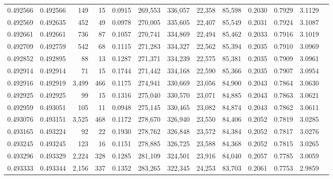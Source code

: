 \begin{tabular}{rrrrrrrrrrrrr}
0.492566 & 0.492566 &   149 &    15 &                                     0.0915 & 269,553 & 336,057 &  22,358 &  85,598 & 0.2030 & 0.7929 & 3.1129 \\
0.492569 & 0.492635 &   452 &    49 &                                     0.0978 & 270,005 & 335,605 &  22,407 &  85,549 & 0.2031 & 0.7924 & 3.1087 \\
0.492661 & 0.492661 &   736 &    87 &                                     0.1057 & 270,741 & 334,869 &  22,494 &  85,462 & 0.2033 & 0.7916 & 3.1019 \\
0.492709 & 0.492759 &   542 &    68 &                                     0.1115 & 271,283 & 334,327 &  22,562 &  85,394 & 0.2035 & 0.7910 & 3.0969 \\
0.492852 & 0.492895 &    88 &    13 &                                     0.1287 & 271,371 & 334,239 &  22,575 &  85,381 & 0.2035 & 0.7909 & 3.0961 \\
0.492914 & 0.492914 &    71 &    15 &                                     0.1744 & 271,442 & 334,168 &  22,590 &  85,366 & 0.2035 & 0.7907 & 3.0954 \\
0.492916 & 0.492919 & 3,499 &   466 &                                     0.1175 & 274,941 & 330,669 &  23,056 &  84,900 & 0.2043 & 0.7864 & 3.0630 \\
0.492925 & 0.492925 &    99 &    15 &                                     0.1316 & 275,040 & 330,570 &  23,071 &  84,885 & 0.2043 & 0.7863 & 3.0621 \\
0.492959 & 0.493051 &   105 &    11 &                                     0.0948 & 275,145 & 330,465 &  23,082 &  84,874 & 0.2043 & 0.7862 & 3.0611 \\
0.493076 & 0.493151 & 3,525 &   468 &                                     0.1172 & 278,670 & 326,940 &  23,550 &  84,406 & 0.2052 & 0.7819 & 3.0285 \\
0.493165 & 0.493224 &    92 &    22 &                                     0.1930 & 278,762 & 326,848 &  23,572 &  84,384 & 0.2052 & 0.7817 & 3.0276 \\
0.493245 & 0.493245 &   123 &    16 &                                     0.1151 & 278,885 & 326,725 &  23,588 &  84,368 & 0.2052 & 0.7815 & 3.0265 \\
0.493296 & 0.493329 & 2,224 &   328 &                                     0.1285 & 281,109 & 324,501 &  23,916 &  84,040 & 0.2057 & 0.7785 & 3.0059 \\
0.493333 & 0.493344 & 2,156 &   337 &                                     0.1352 & 283,265 & 322,345 &  24,253 &  83,703 & 0.2061 & 0.7753 & 2.9859 \\

\end{tabular}
